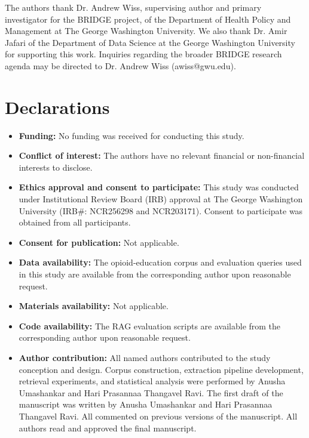 \documentclass[pdflatex,sn-mathphys-num]{sn-jnl}
\theoremstyle{thmstyleone}
\theoremstyle{thmstyletwo}
\theoremstyle{thmstylethree}
\begin{document}
\backmatter

The authors thank Dr. Andrew Wiss, supervising author and primary 
investigator for the BRIDGE project, of the Department of Health 
Policy and Management at The George Washington University. We also thank Dr. Amir Jafari of the Department of Data Science at the George Washington University for supporting this work. Inquiries regarding the broader BRIDGE research agenda may be directed to Dr. Andrew Wiss (awiss@gwu.edu).

\section*{Declarations}

\begin{itemize}
\item \textbf{Funding:} No funding was received for conducting this study.
\item \textbf{Conflict of interest:} The authors have no relevant financial or non-financial interests to disclose.
\item \textbf{Ethics approval and consent to participate:} This study was  conducted under Institutional Review Board (IRB) approval at The George Washington University (IRB\#: NCR256298 and NCR203171). 
Consent to participate was obtained from all participants.
\item \textbf{Consent for publication:} Not applicable.
\item \textbf{Data availability:} The opioid-education corpus and evaluation queries used in this study are available from the corresponding author upon reasonable request.
\item \textbf{Materials availability:} Not applicable.
\item \textbf{Code availability:} The RAG evaluation scripts are available from the corresponding author upon reasonable request.
\item \textbf{Author contribution:} All named authors contributed to the study conception and design. Corpus construction, extraction pipeline development, retrieval experiments, and statistical analysis were performed by Anusha Umashankar and Hari Prasannaa Thangavel Ravi. The first draft of the manuscript was written by Anusha Umashankar and Hari Prasannaa Thangavel Ravi. All commented on previous versions of the manuscript. All authors read and approved the final manuscript.
\end{itemize}
\end{document}

